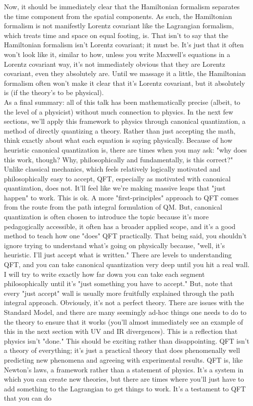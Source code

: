 \noindent Now, it should be immediately clear that the Hamiltonian formalism separates the time component from the spatial components. As such, the Hamiltonian formalism is not manifestly Lorentz covariant like the Lagrangian formalism, which treats time and space on equal footing, is. That isn't to say that the Hamiltonian formalism isn't Lorentz covariant; it must be. It's just that it often won't look like it, similar to how, unless you write Maxwell's equations in a Lorentz covariant way, it's not immediately obvious that they are Lorentz covariant, even they absolutely are. Until we massage it a little, the Hamiltonian formalism often won't make it clear that it's Lorentz covariant, but it absolutely is (if the theory's to be physical). \\

\noindent As a final summary: all of this talk has been mathematically precise (albeit, to the level of a physicist) without much connection to physics. In the next few sections, we'll apply this framework to physics through canonical quantization, a method of directly quantizing a theory. Rather than just accepting the math, think exactly about what each equation is saying physically. Because of how heuristic canonical quantization is, there are times when you may ask: "why does this work, though? Why, philosophically and fundamentally, is this correct?" Unlike classical mechanics, which feels relatively logically motivated and philosophically easy to accept, QFT, especially as motivated with canonical quantization, does not. It'll feel like we're making massive leaps that "just happen" to work. This is ok. A more "first-principles" approach to QFT comes from the route from the path integral formulation of QM. But, canonical quantization is often chosen to introduce the topic because it's more pedagogically accessible, it often has a broader applied scope, and it's a good method to teach how one "does" QFT practically. That being said, you shouldn't ignore trying to understand what's going on physically because, "well, it's heuristic. I'll just accept what is written." There are levels to understanding QFT, and you can take canonical quantization very deep until you hit a real wall. I will try to write exactly how far down you can take each segment philosophically until it's "just something you have to accept." But, note that every "just accept" wall is usually more fruitfully explained through the path integral approach. Obviously, it's not a perfect theory. There are issues with the Standard Model, and there are many seemingly ad-hoc things one needs to do to the theory to ensure that it works (you'll almost immediately see an example of this in the next section with UV and IR divergences). This is a reflection that physics isn't "done." This should be exciting rather than disappointing. QFT isn't a theory of everything; it's just a practical theory that does phenomenally well predicting new phenomena and agreeing with experimental results. QFT is, like Newton's laws, a framework rather than a statement of physics. It's a system in which you can create new theories, but there are times where you'll just have to add something to the Lagrangian to get things to work. It's a testament to QFT that you can do 